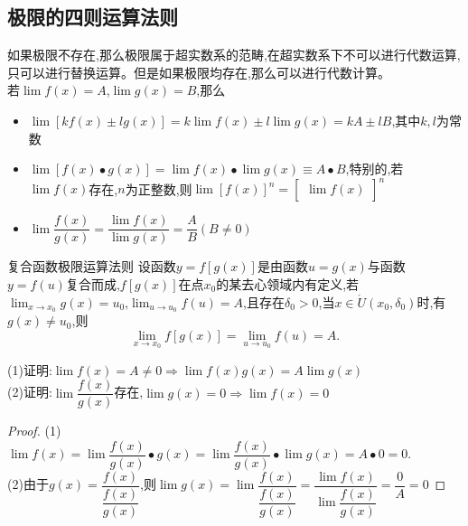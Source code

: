 \documentclass[12pt, a4paper, oneside, UTF8]{ctexbook}
\begin{document}
\begin{sloppypar}
    \subsection{极限的四则运算法则}\label{jxdsz1}
    如果极限不存在,那么极限属于超实数系的范畴,在超实数系下不可以进行代数运算,只可以进行替换运算。但是如果极限均存在,那么可以进行代数计算。\\
    若$\lim f(x)=A$,$\lim g(x)=B$,那么
    \begin{itemize}
        \item $\operatorname*{lim}[kf(x)\pm lg(x)]=k\operatorname*{lim}f(x)\pm l\operatorname*{lim}g(x)=kA\pm lB$,其中$k,l$为常数
        \item $\operatorname*{lim}[f(x)\bullet g(x)]=\operatorname*{lim}f(x)\bullet\operatorname*{lim}g(x)\equiv A\bullet B$,特别的,若$\lim f(x)$存在,$n$为正整数,则$\operatorname{lim}[f(x)]^n=\begin{bmatrix}\operatorname{lim}f(x)\end{bmatrix}^n$
        \item $\operatorname*{lim}\dfrac{f(x)}{g(x)}=\dfrac{\operatorname*{lim}f(x)}{\operatorname*{lim}g(x)}=\dfrac{A}{B}(B\neq0)$
    \end{itemize}
    \begin{defn}{复合函数极限运算法则}{}
        设函数$y=f[g(x)]$是由函数$u=g(x)$与函数$y=f(u)$复合而成,$f[g(x)]$在点$x_0$的某去心领域内有定义,若$\lim_{x \to  x_0} g(x)=u_0$,$\lim_{u \to u_0}f(u)=A$,且存在$\delta_0 >0$,当$x\in\mathring{U}\left(x_{0},\delta_{0}\right)$时,有$g\left(x\right)\neq u_{0}$,则
        $$
            \underset{x\to x_0}{\operatorname*{lim}}f[g(x)]=\underset{u\to u_0}{\operatorname*{lim}}f(u)=A.
        $$
    \end{defn}
    \begin{problem}
        (1)证明:$\lim f(x)=A \neq 0 \Rightarrow \lim f(x)g(x)=A \lim g(x)$\\
        (2)证明:$\lim \dfrac{f(x)}{g(x)}$存在,$\lim g(x)=0 \Rightarrow \lim f(x)=0$
    \end{problem}
    \begin{proof}
        (1)$\lim f(x)=\lim\dfrac{f(x)}{g(x)}\bullet g(x)=\lim\dfrac{f(x)}{g(x)}\bullet\lim g(x)=A\bullet0=0.$
        \\
        (2)由于$g(x)=\dfrac{f(x)}{\dfrac{f(x)}{g(x)}}$,则$\lim g(x)=\lim\dfrac{f(x)}{\dfrac{f(x)}{g(x)}}=\dfrac{\lim f(x)}{\lim\dfrac{f(x)}{g(x)}}=\dfrac{0}{A}=0$ 
    \end{proof}
    \begin{note}

\end{note}
\end{sloppypar}
\end{document}
